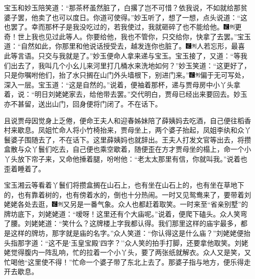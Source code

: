 宝玉和妙玉陪笑道：``那茶杯虽然脏了，白撂了岂不可惜？依我说，不如就给那贫婆子罢，他卖了也可以度日。你道可使得。''妙玉听了，想了一想，点头说道：``这也罢了。幸而那杯子是我没吃过的，若我使过，我就砸碎了也不能给他。{\includegraphics[width=3mm]{../Images/00006}\includegraphics[width=3mm]{../Images/00011}\footnotesize \kaishu 更奇！世上我也见过此等人。}你要给他，我也不管你，只交给你，快拿了去罢。''宝玉道：``自然如此，你那里和他说话授受去，越发连你也脏了。{\includegraphics[width=3mm]{../Images/00006}\includegraphics[width=3mm]{../Images/00011}\footnotesize \kaishu 人若忘形，最喜此等言语。}只交与我就是了。''妙玉便命人拿来递与宝玉。宝玉接了，又道：``等我们出去了，我叫几个小幺儿来河里打几桶水来洗地如何？''妙玉笑道：``这更好了，只是你嘱咐他们，抬了水只搁在山门外头墙根下，别进门来。''{\includegraphics[width=3mm]{../Images/00006}\includegraphics[width=3mm]{../Images/00011}\footnotesize \kaishu 偏于无可写处，深入一层。}宝玉道：``这是自然的。''说着，便袖着那杯，递与贾母房中小丫头拿着，说：``明日刘姥姥家去，给他带去罢。''交代明白，贾母已经出来要回去。妙玉亦不甚留，送出山门，回身便将门闭了。不在话下。

且说贾母因觉身上乏倦，便命王夫人和迎春姊妹陪了薛姨妈去吃酒，自己便往稻香村来歇息。凤姐忙命人将小竹椅抬来，贾母坐上，两个婆子抬起，凤姐李纨和众丫鬟婆子围随去了，不在话下。这里薛姨妈也就辞出。王夫人打发文官等出去，将攒盒散与众丫鬟们吃去，自己便也乘空歇着，随便歪在方才贾母坐的榻上，命一个小丫头放下帘子来，又命他捶着腿，吩咐他：``老太太那里有信，你就叫我。''说着也歪着睡着了。

宝玉湘云等看着丫鬟们将攒盒搁在山石上，也有坐在山石上的，也有坐在草地下的，也有靠着树的，也有傍着水的，倒也十分热闹。一时又见鸳鸯来了，要带着刘姥姥各处去逛，{\includegraphics[width=3mm]{../Images/00006}\includegraphics[width=3mm]{../Images/00011}\footnotesize \kaishu 又另是一番气象。}众人也都赶着取笑。一时来至``省亲别墅''的牌坊底下，刘姥姥道：``嗳呀！这里还有个大庙呢。''说着，便爬下磕头。众人笑弯了腰。刘姥姥道：``笑什么？这牌楼上字我都认得。我们那里这样的庙宇最多，都是这样的牌坊，那字就是庙的名字。''众人笑道：``你认得这是什么庙？''刘姥姥便抬头指那字道：``这不是`玉皇宝殿'四字？''众人笑的拍手打脚，还要拿他取笑。刘姥姥觉得腹内一阵乱响，忙的拉着一个小丫头，要了两张纸就解衣。众人又是笑，又忙喝他``这里使不得！''忙命一个婆子带了东北上去了。那婆子指与地方，便乐得走开去歇息。

